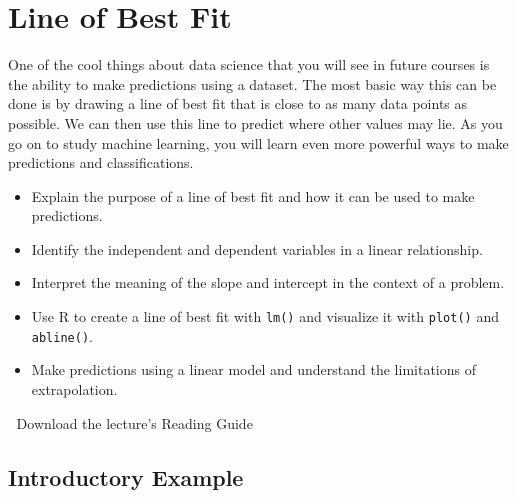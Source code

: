 \documentclass[
  letterpaper,
  DIV=11,
  numbers=noendperiod]{scrreprt}
\providecommand{\tightlist}{%
  \setlength{\itemsep}{0pt}\setlength{\parskip}{0pt}}
\begin{document}

\chapter{Line of Best Fit}\label{line-of-best-fit}

One of the cool things about data science that you will see in future
courses is the ability to make predictions using a dataset. The most
basic way this can be done is by drawing a line of best fit that is
close to as many data points as possible. We can then use this line to
predict where other values may lie. As you go on to study machine
learning, you will learn even more powerful ways to make predictions and
classifications.

\begin{itemize}
\tightlist
\item
  Explain the purpose of a line of best fit and how it can be used to
  make predictions.
\item
  Identify the independent and dependent variables in a linear
  relationship.
\item
  Interpret the meaning of the slope and intercept in the context of a
  problem.
\item
  Use R to create a line of best fit with \texttt{lm()} and visualize it
  with \texttt{plot()} and \texttt{abline()}.
\item
  Make predictions using a linear model and understand the limitations
  of extrapolation.
\end{itemize}

\begin{tcolorbox}[enhanced jigsaw, leftrule=.75mm, arc=.35mm, coltitle=black, rightrule=.15mm, bottomrule=.15mm, toprule=.15mm, left=2mm, colbacktitle=quarto-callout-tip-color!10!white, title=\textcolor{quarto-callout-tip-color}{\faLightbulb}\hspace{0.5em}{Supplemental Material}, toptitle=1mm, breakable, colframe=quarto-callout-tip-color-frame, bottomtitle=1mm, titlerule=0mm, colback=white, opacityback=0, opacitybacktitle=0.6]

📄 Download the lecture's Reading Guide

\end{tcolorbox}

\section{Introductory Example}\label{introductory-example}
\end{document}
